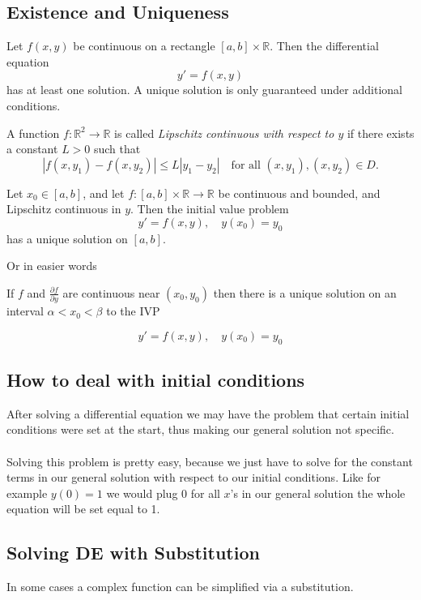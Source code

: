 \subsection{Existence and Uniqueness}

Let \( f(x, y) \) be continuous on a rectangle \( [a, b] \times \mathbb{R} \). Then the differential equation
\[
y' = f(x, y)
\]
has at least one solution. A unique solution is only guaranteed under additional conditions.

A function \( f : \mathbb{R}^2 \to \mathbb{R} \) is called \emph{Lipschitz continuous with respect to \( y \)} if there exists a constant \( L > 0 \) such that
\[
|f(x, y_1) - f(x, y_2)| \leq L |y_1 - y_2|
\quad \text{for all } (x, y_1), (x, y_2) \in D.
\]

Let \( x_0 \in [a, b] \), and let \( f : [a, b] \times \mathbb{R} \to \mathbb{R} \) be continuous and bounded, and Lipschitz continuous in \( y \). Then the initial value problem
\[
y' = f(x, y), \quad y(x_0) = y_0
\]
has a unique solution on \( [a, b] \).

Or in easier words

If \(f\) and \(\frac{\partial f}{\partial y}\) are continuous near \((x_0, y_0)\) then
there is a unique solution on an interval \(\alpha < x_0 < \beta\) to the IVP

\[y' = f(x,y), \quad y(x_0) = y_0\]

\subsection{How to deal with initial conditions}

After solving a differential equation we may have the problem that certain initial
conditions were set at the start, thus making our general solution not specific.
\\\\
Solving this problem is pretty easy, because we just have to solve for the constant terms
in our general solution with respect to our initial conditions. Like for example \(y(0) = 1\)
we would plug 0 for all \(x\)'s in our general solution the whole equation will be set equal to 1.

\subsection{Solving DE with Substitution}

In some cases a complex function can be simplified via a substitution.

